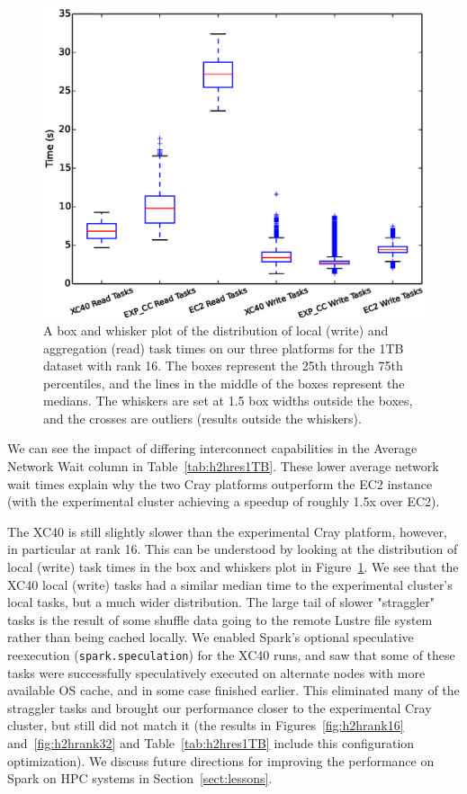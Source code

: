    \begin{figure} [H]
    \begin{centering}
    \includegraphics[scale=0.4]{images/boxplot_read_write_task_new_Rank_16_1T_default_partitions.eps}
    \end{centering}
    \caption{A box and whisker plot of the distribution of local (write) and aggregation (read) task times on our three platforms for the 1TB dataset with rank 16.  The boxes represent the 25th through 75th percentiles, and the lines in the middle of the boxes represent the medians.  The whiskers are set at 1.5 box widths outside the boxes, and the crosses are outliers (results outside the whiskers).}
    \label{fig:rwtaskdist} 
    \end{figure}

We can see the impact of differing interconnect capabilities in the Average Network Wait column in Table~\ref{tab:h2hres1TB}.   These lower average network wait times explain why the two Cray platforms outperform the EC2 instance (with the experimental cluster achieving a speedup of roughly 1.5x over EC2).  

The XC40 is still slightly slower than the experimental Cray platform, however, in particular at rank 16.  This can be understood by looking at the distribution of local (write) task times in the box and whiskers plot in Figure~\ref{fig:rwtaskdist}.  We see that the XC40 local (write) tasks had a similar median time to the experimental cluster's local tasks, but a much wider distribution.  The large tail of slower "straggler" tasks is the result of some shuffle data going to the remote Lustre file system rather than being cached locally. We enabled Spark's optional speculative reexecution (\texttt{spark.speculation}) for the XC40 runs, and saw that some of these tasks were successfully speculatively executed on alternate nodes with more available OS cache, and in some case finished earlier.  This eliminated many of the straggler tasks and brought our performance closer to the experimental Cray cluster, but still did not match it (the results in Figures~\ref{fig:h2hrank16} and~\ref{fig:h2hrank32} and Table~\ref{tab:h2hres1TB} include this configuration optimization).  We discuss future directions for improving the performance on Spark on HPC systems in Section~\ref{sect:lessons}.
